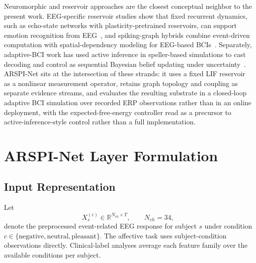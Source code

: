 \documentclass[journal]{IEEEtran}
\begin{document}
Neuromorphic and reservoir approaches are the closest conceptual neighbor to the present work. EEG-specific reservoir studies show that fixed recurrent dynamics, such as echo-state networks with plasticity-pretrained reservoirs, can support emotion recognition from EEG~\cite{maass2002liquid,jaeger2001echo,lukosevicius2009reservoir,fourati2018reservoir}, and spiking-graph hybrids combine event-driven computation with spatial-dependency modeling for EEG-based BCIs~\cite{gong2023sglnet,cai2024spiking,davies2018loihi,furber2014spinnaker}. Separately, adaptive-BCI work has used active inference in speller-based simulations to cast decoding and control as sequential Bayesian belief updating under uncertainty~\cite{mladenovic2018active,rao1999predictive,friston2010free,parr2022activeinference,pezzulo2015active}. ARSPI-Net sits at the intersection of these strands: it uses a fixed LIF reservoir as a nonlinear measurement operator, retains graph topology and coupling as separate evidence streams, and evaluates the resulting substrate in a closed-loop adaptive BCI simulation over recorded ERP observations rather than in an online deployment, with the expected-free-energy controller read as a precursor to active-inference-style control rather than a full implementation.

\section{ARSPI-Net Layer Formulation}
\subsection{Input Representation}
Let
\begin{equation}
X_s^{(c)} \in \mathbb{R}^{N_{ch}\times T}, \qquad N_{ch}=34,
\end{equation}
denote the preprocessed event-related EEG response for subject $s$ under condition $c\in\{\mathrm{negative},\mathrm{neutral},\mathrm{pleasant}\}$. The affective task uses subject-condition observations directly. Clinical-label analyses average each feature family over the available conditions per subject.
\end{document}
